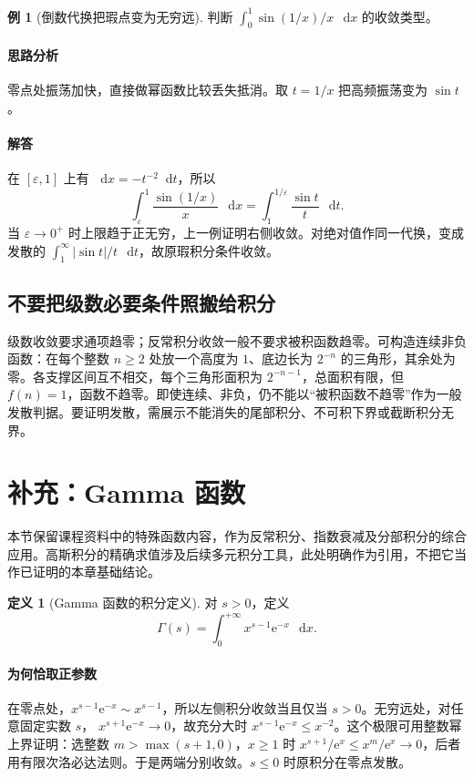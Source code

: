 \documentclass[UTF8,fontset=fandol,12pt,oneside,openany]{ctexrep}
\newcommand{\dd}{\mathop{}\!\mathrm d}
\newcommand{\ee}{\mathrm e}
\theoremstyle{definition}
\newtheorem{definition}[theorem]{定义}
\newtheorem{example}{例}[chapter]
\begin{document}
\begin{example}[倒数代换把瑕点变为无穷远]
判断 $\int_0^1\sin(1/x)/x\,\dd x$ 的收敛类型。
\end{example}
\paragraph{思路分析} 零点处振荡加快，直接做幂函数比较丢失抵消。取 $t=1/x$ 把高频振荡变为 $\sin t$。
\paragraph{解答} 在 $[\varepsilon,1]$ 上有 $\dd x=-t^{-2}\dd t$，所以
\[
\int_\varepsilon^1\frac{\sin(1/x)}x\,\dd x
=\int_1^{1/\varepsilon}\frac{\sin t}{t}\,\dd t.
\]
当 $\varepsilon\to0^+$ 时上限趋于正无穷，上一例证明右侧收敛。对绝对值作同一代换，变成发散的 $\int_1^\infty|\sin t|/t\,\dd t$，故原瑕积分条件收敛。

\subsection{不要把级数必要条件照搬给积分}
级数收敛要求通项趋零；反常积分收敛一般不要求被积函数趋零。可构造连续非负函数：在每个整数 $n\ge2$ 处放一个高度为 $1$、底边长为 $2^{-n}$ 的三角形，其余处为零。各支撑区间互不相交，每个三角形面积为 $2^{-n-1}$，总面积有限，但 $f(n)=1$，函数不趋零。即使连续、非负，仍不能以“被积函数不趋零”作为一般发散判据。要证明发散，需展示不能消失的尾部积分、不可积下界或截断积分无界。

\section{补充：Gamma 函数}
\label{lec:13:gamma}
本节保留课程资料中的特殊函数内容，作为反常积分、指数衰减及分部积分的综合应用。高斯积分的精确求值涉及后续多元积分工具，此处明确作为引用，不把它当作已证明的本章基础结论。

\begin{definition}[Gamma 函数的积分定义]
对 $s>0$，定义
\[
\Gamma(s)=\int_0^{+\infty}x^{s-1}\ee^{-x}\,\dd x.
\]
\end{definition}
\paragraph{为何恰取正参数} 在零点处，$x^{s-1}\ee^{-x}\sim x^{s-1}$，所以左侧积分收敛当且仅当 $s>0$。无穷远处，对任意固定实数 $s$，
$x^{s+1}\ee^{-x}\to0$，故充分大时 $x^{s-1}\ee^{-x}\le x^{-2}$。这个极限可用整数幂上界证明：选整数 $m>\max(s+1,0)$，$x\ge1$ 时 $x^{s+1}/\ee^x\le x^m/\ee^x\to0$，后者用有限次洛必达法则。于是两端分别收敛。$s\le0$ 时原积分在零点发散。
\end{document}
